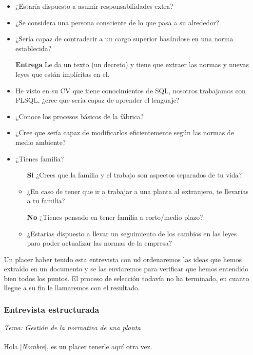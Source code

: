 \documentclass[a4paper]{article}
\begin{document}
\begin{itemize}
	\item ¿Estaría dispuesto a asumir responsabilidades extra?
	\item ¿Se considera una persona consciente de lo que pasa a su alrededor?
	\item ¿Sería capaz de contradecir a un cargo superior basándose en una norma establecida?
	\item[\textbf{Entrega}] Le da un texto (un decreto) y tiene que extraer las normas y nuevas leyes que están implícitas en el.
	\item He visto en su CV que tiene conocimientos de SQL, nosotros trabajamos con PLSQL, ¿cree que sería capaz de aprender el lenguaje?
	\item ¿Conoce los procesos básicos de la fábrica?
	\item ¿Cree que sería capaz de modificarlos eficientemente según las normas de medio ambiente?
	\item ¿Tienes familia?
	\begin{itemize}		
		\item[\textbf{Si}] ¿Crees que la familia y el trabajo son aspectos separados de tu vida?
		\item ¿En caso de tener que ir a trabajar a una planta al extranjero, te llevarias a tu familia?
		\item[\textbf{No}] ¿Tienes pensado en tener familia a corto/medio plazo?
		\item ¿Estarias dispuesto a llevar un seguimiento de los cambios en las leyes para poder actualizar las normas de la empresa?
	\end{itemize}
\end{itemize}
Un placer haber tenido esta entrevista con ud ordenaremos las ideas que hemos extraído en un documento y se las enviaremos para verificar que hemos entendido bien todos los puntos. El proceso de selección todavía no ha terminado, en cuanto llegue a su fin le llamaremos con el resultado.

\subsubsection{Entrevista estructurada}
\textit{Tema: Gestión de la normativa de una planta}\\\\
Hola [\textit{Nombre}], es un placer tenerle aquí otra vez.
\end{document}
